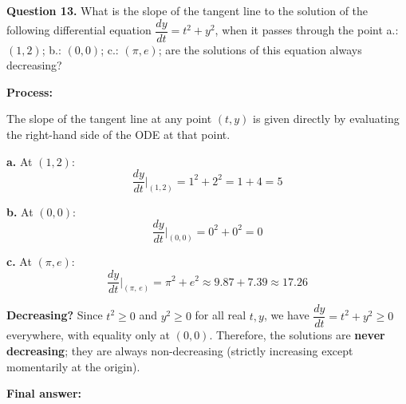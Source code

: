 \textbf{Question 13.} What is the slope of the tangent line to the solution of the 
following differential equation $\dfrac{dy}{dt} = t^2 + y^2$, when it passes through 
the point a.: $(1,2)$; b.: $(0,0)$; c.: $(\pi, e)$; are the solutions of this equation 
always decreasing?
\begin{respuesta}

\textbf{Process:}

The slope of the tangent line at any point $(t, y)$ is given directly by evaluating 
the right-hand side of the ODE at that point.

\textbf{a.} At $(1, 2)$:
\[
    \frac{dy}{dt}\bigg|_{(1,2)} = 1^2 + 2^2 = 1 + 4 = 5
\]

\textbf{b.} At $(0, 0)$:
\[
    \frac{dy}{dt}\bigg|_{(0,0)} = 0^2 + 0^2 = 0
\]

\textbf{c.} At $(\pi, e)$:
\[
    \frac{dy}{dt}\bigg|_{(\pi,\, e)} = \pi^2 + e^2 \approx 9.87 + 7.39 \approx 17.26
\]

\textbf{Decreasing?} Since $t^2 \geq 0$ and $y^2 \geq 0$ for all real $t, y$, we have
$\dfrac{dy}{dt} = t^2 + y^2 \geq 0$ everywhere, with equality only at $(0,0)$.
Therefore, the solutions are \textbf{never decreasing}; they are always non-decreasing 
(strictly increasing except momentarily at the origin).

    \textbf{Final answer:}
    \begin{center}
    \end{center}
\end{respuesta}








